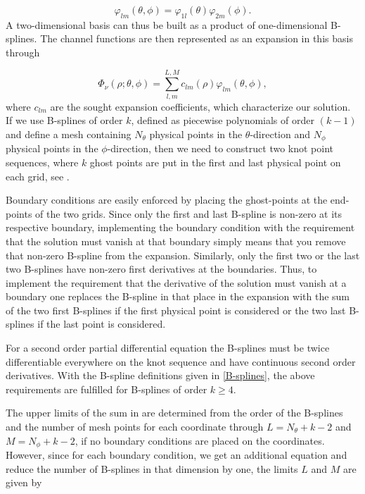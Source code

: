 \begin{equation}
\varphi_{lm} (\theta,\phi) = \varphi_{1l}(\theta)\varphi_{2m}(\phi).
\end{equation}
A two-dimensional basis can thus be built as a product of one-dimensional B-splines. The channel functions are then represented as an expansion in this basis through  

\begin{equation}\label{expansion}
\Phi_{\nu}(\rho;\theta,\phi) = \sum_{l,m}^{L,M} c_{lm}(\rho)\varphi_{lm} (\theta,\phi),
\end{equation}
where $c_{lm}$ are the sought expansion coefficients, which characterize our solution. If we use B-splines of order $k$, defined as piecewise polynomials of order $(k-1)$ and define a mesh containing $N_{\theta}$ physical points in the $\theta$-direction and $N_{\phi}$ physical points in the $\phi$-direction, then we need to construct two knot point sequences, where $k$ ghost points are put in the first and last physical point on each grid, see . 

Boundary conditions are easily enforced by placing the ghost-points at the end-points of the two grids. Since only the first and last B-spline is non-zero at its respective boundary, implementing the boundary condition with the requirement that the solution must vanish at that boundary simply means that you remove that non-zero B-spline from the expansion. Similarly, only the first two or the last two B-splines have non-zero first derivatives at the boundaries. Thus, to implement the requirement that the derivative of the solution must vanish at a boundary one replaces the B-spline in that place in the expansion with the sum of the two first B-splines if the first physical point is considered or the two last B-splines if the last point is considered.

For a second order partial differential equation the B-splines must be twice differentiable everywhere on the knot sequence and have continuous second order derivatives. With the B-spline definitions given in \cref{B-splines}, the above requirements are fulfilled for B-splines of order $k\geq 4$. 

The upper limits of the sum in  are determined from the order of the B-splines and the number of mesh points for each coordinate through $L=N_{\theta}+k-2$ and $M=N_{\phi}+k-2$, if no boundary conditions are placed on the coordinates. However, since for each boundary condition, we get an additional equation and reduce the number of B-splines in that dimension by one, the limits $L$ and $M$ are given by 


